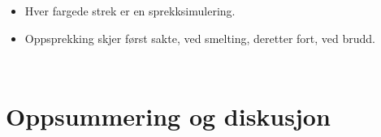 \documentclass[utf8x, notes, graphics]{beamer}
\begin{document}
\begin{frame}
\frametitle{}
\begin{columns}
\begin{itemize}
\item Hver fargede strek er en sprekksimulering.
\item Oppsprekking skjer først sakte, ved smelting, deretter fort, ved brudd.
\end{itemize}
\end{columns}

\end{frame}


\section{Oppsummering og diskusjon}
\end{document}
